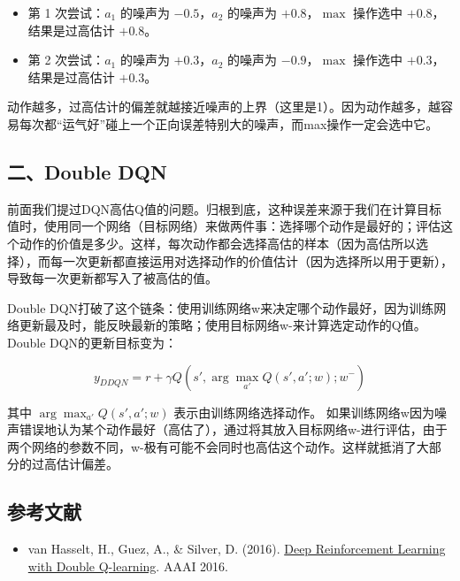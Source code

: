 \begin{itemize}
\tightlist
\item
  第 1 次尝试：\(a_1\) 的噪声为 \(-0.5\)，\(a_2\) 的噪声为 \(+0.8\)，\(\max\) 操作选中 \(+0.8\)，结果是过高估计 \(+0.8\)。
\item
  第 2 次尝试：\(a_1\) 的噪声为 \(+0.3\)，\(a_2\) 的噪声为 \(-0.9\)，\(\max\) 操作选中 \(+0.3\)，结果是过高估计 \(+0.3\)。
\end{itemize}

动作越多，过高估计的偏差就越接近噪声的上界（这里是1）。因为动作越多，越容易每次都``运气好''碰上一个正向误差特别大的噪声，而max操作一定会选中它。

\hypertarget{ux4e8cdouble-dqn}{%
\subsection{二、Double DQN}\label{ux4e8cdouble-dqn}}

前面我们提过DQN高估Q值的问题。归根到底，这种误差来源于我们在计算目标值时，使用同一个网络（目标网络）来做两件事：选择哪个动作是最好的；评估这个动作的价值是多少。这样，每次动作都会选择高估的样本（因为高估所以选择），而每一次更新都直接运用对选择动作的价值估计（因为选择所以用于更新），导致每一次更新都写入了被高估的值。

Double DQN打破了这个链条：使用训练网络w来决定哪个动作最好，因为训练网络更新最及时，能反映最新的策略；使用目标网络w-来计算选定动作的Q值。Double DQN的更新目标变为：

\[
y_{DDQN}=r+\gamma Q(s',\arg\max_{a'}Q(s',a';w);w^{-})
\]

其中 \(\arg\max_{a'}Q(s',a';w)\) 表示由训练网络选择动作。
如果训练网络w因为噪声错误地认为某个动作最好（高估了），通过将其放入目标网络w-进行评估，由于两个网络的参数不同，w-极有可能不会同时也高估这个动作。这样就抵消了大部分的过高估计偏差。

\hypertarget{ux53c2ux8003ux6587ux732e-49}{%
\subsection{参考文献}\label{ux53c2ux8003ux6587ux732e-49}}

\begin{itemize}
\tightlist
\item
  van Hasselt, H., Guez, A., \& Silver, D. (2016). \href{https://arxiv.org/abs/1509.06461}{Deep Reinforcement Learning with Double Q-learning}. AAAI 2016.
\end{itemize}

\clearpage

